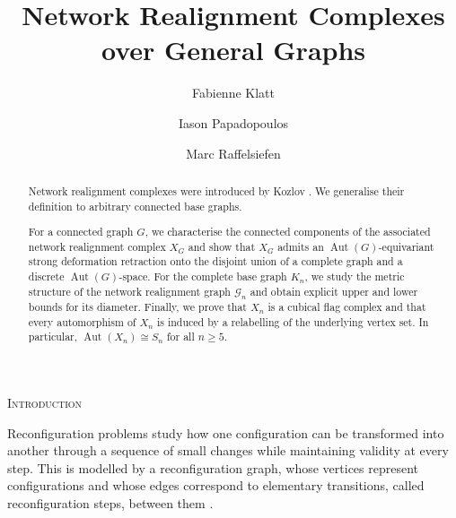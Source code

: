 \documentclass[reqno,dvipsnames]{amsart}
\theoremstyle{plain}
\numberwithin{equation}{section}
\theoremstyle{definition}
\DeclareMathOperator{\Aut}{Aut}
\begin{document}
	
	\title{Network Realignment Complexes over General Graphs}

	\author{Fabienne Klatt}
	\author{Iason Papadopoulos}
	\author{Marc Raffelsiefen}

	\address[F. Klatt, I. Papadopoulos, and M. Raffelsiefen]{\newline
	Department of Mathematics\\
	University of Bremen\\
	Bibliothekstraße 5\\
	28359 Bremen\\
	Germany
	}


	
	\begin{abstract}
	Network realignment complexes were introduced by Kozlov \cite{Kozlov25}. We generalise their definition to arbitrary connected base graphs.

	For a connected graph $G$, we characterise the connected components of the associated network realignment complex $X_G$ and show that $X_G$ admits an $\Aut(G)$-equivariant strong deformation retraction onto the disjoint union of a complete graph and a discrete $\Aut(G)$-space.	For the complete base graph $K_n$, we study the metric structure of the network realignment graph $\mathcal{G}_n$ and obtain explicit upper and lower bounds for its diameter. Finally, we prove that $X_n$ is a cubical flag complex and that every automorphism of $X_n$ is induced by a relabelling of the underlying vertex set. In particular, $\Aut(X_n)\cong S_n$ for all $n\geq 5$.
	\end{abstract}


	\maketitle
	

\vspace*{-5mm}
\begin{center}
	\normalfont\scshape Introduction
\end{center}\vspace*{-2mm} 

Reconfiguration problems study how one configuration can be transformed into another through a sequence of small changes while maintaining validity at every step. This is modelled by a reconfiguration graph, whose vertices represent configurations and whose edges correspond to elementary transitions, called reconfiguration steps, between them \cite{Ito11}.
\end{document}
